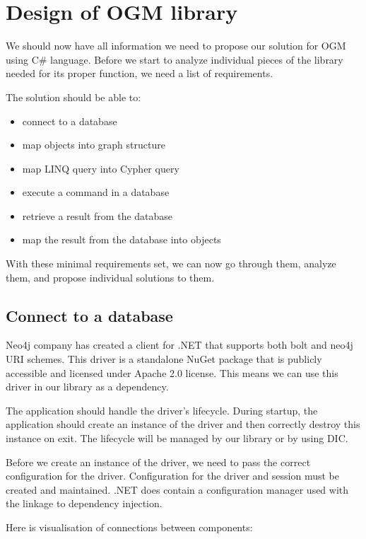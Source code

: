 \chapter {Design of OGM library}

We should now have all information we need to propose our solution for OGM using C\# language.
Before we start to analyze individual pieces of the library needed for its proper function, we need a list of requirements.

The solution should be able to:
\begin{itemize}
    \item {connect to a database}
    \item {map objects into graph structure}
    \item {map LINQ query into Cypher query}
    \item {execute a command in a database}
    \item {retrieve a result from the database}
    \item {map the result from the database into objects}
\end{itemize}

With these minimal requirements set, we can now go through them, analyze them, and propose individual solutions to them.

\section{Connect to a database}

Neo4j company has created a client for .NET that supports both bolt and neo4j URI schemes. \cite{noauthor_client_nodate} This driver is a standalone NuGet package that is publicly accessible and licensed under Apache 2.0 license. This means we can use this driver in our library as a dependency.

The application should handle the driver's lifecycle. During startup, the application should create an instance of the driver and then correctly destroy this instance on exit. The lifecycle will be managed by our library or by using DIC.

Before we create an instance of the driver, we need to pass the correct configuration for the driver. Configuration for the driver and session must be created and maintained. .NET does contain a configuration manager used with the linkage to dependency injection.

Here is visualisation of connections between components:

